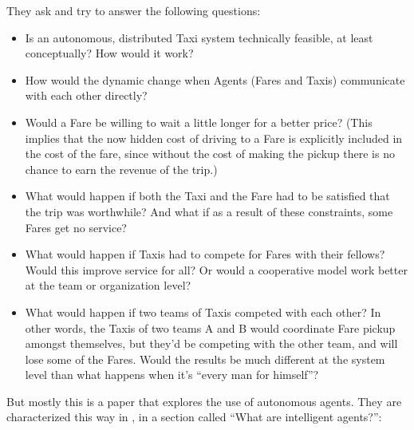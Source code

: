 \documentclass[11pt,letterpaper,onecolumn,twoside,openright,draft]{report}
\begin{document}
They ask and try to answer the following questions:
\begin{itemize}
  \item{Is an autonomous, distributed Taxi system technically feasible, at least conceptually?
    How would it work?}
  \item{How would the dynamic change when Agents (Fares and Taxis) communicate with each other directly?}
  \item{Would a Fare be willing to wait a little longer for a better price?
    (This implies that the now hidden cost of driving to a Fare is explicitly included in the cost of the fare, since without the cost of making the pickup there is no chance to earn the revenue of the trip.)}
  \item{What would happen if both the Taxi and the Fare had to be satisfied that the trip was worthwhile?
    And what if as a result of these constraints, some Fares get no service?}
  \item{What would happen if Taxis had to compete for Fares with their fellows?
    Would this improve service for all?
    Or would a cooperative model work better at the team or organization level?}
  \item{What would happen if two teams of Taxis competed with each other?
    In other words, the Taxis of two teams A and B would coordinate Fare pickup amongst themselves, but they’d be competing with the other team, and will lose some of the Fares.
    Would the results be much different at the system level than what happens when it's ``every man for himself''?}
\end{itemize}

But mostly this is a paper that explores the use of autonomous agents.
They are characterized this way in \cite{roozemond2000act}, in a section called ``What are intelligent agents?'':

\end{document}
